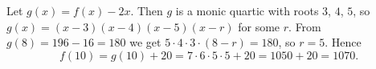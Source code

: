 Let $g(x)=f(x)-2x$. Then $g$ is a monic quartic with roots $3$, $4$, $5$, so $g(x)=(x-3)(x-4)(x-5)(x-r)$ for some $r$. From $g(8)=196-16=180$ we get $5\cdot4\cdot3\cdot(8-r)=180$, so $r=5$. Hence
\[f(10)=g(10)+20=7\cdot6\cdot5\cdot5+20=1050+20=\boxed{1070}.\]
